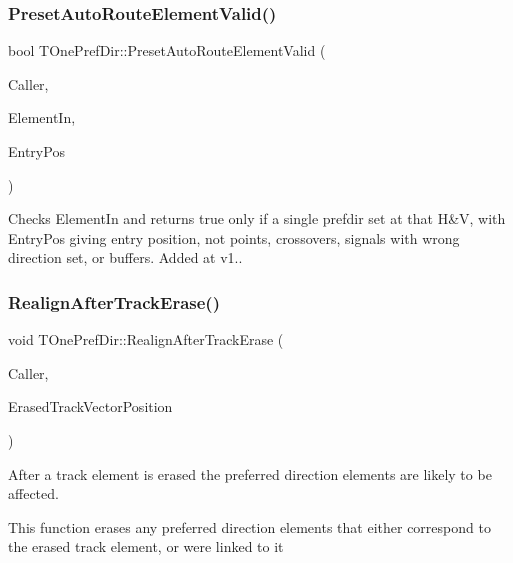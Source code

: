 \subsubsection{\texorpdfstring{Preset\+Auto\+Route\+Element\+Valid()}{PresetAutoRouteElementValid()}}
{\footnotesize\ttfamily bool T\+One\+Pref\+Dir\+::\+Preset\+Auto\+Route\+Element\+Valid (\begin{DoxyParamCaption}\item[{int}]{Caller,  }\item[{\mbox{\hyperlink{class_t_pref_dir_element}{T\+Pref\+Dir\+Element}}}]{Element\+In,  }\item[{int}]{Entry\+Pos }\end{DoxyParamCaption})\hspace{0.3cm}{\ttfamily [protected]}}

Checks Element\+In and returns true only if a single prefdir set at that H\&V, with Entry\+Pos giving entry position, not points, crossovers, signals with wrong direction set, or buffers. Added at v1.. \mbox{\label{class_t_one_pref_dir_ab5bb3791670fd04645faf4ab1f2a5781}} 
\subsubsection{\texorpdfstring{Realign\+After\+Track\+Erase()}{RealignAfterTrackErase()}}
{\footnotesize\ttfamily void T\+One\+Pref\+Dir\+::\+Realign\+After\+Track\+Erase (\begin{DoxyParamCaption}\item[{int}]{Caller,  }\item[{int}]{Erased\+Track\+Vector\+Position }\end{DoxyParamCaption})}

After a track element is erased the preferred direction elements are likely to be affected.

This function erases any preferred direction elements that either correspond to the erased track element, or were linked to it \mbox{\label{class_t_one_pref_dir_a1e62c2571d3629a067e1071086de72de}} 
